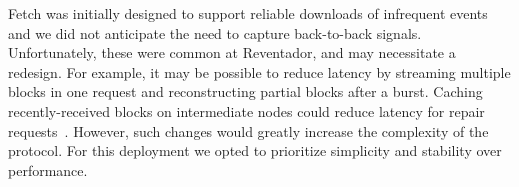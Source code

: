 
Fetch was initially designed to support reliable downloads of infrequent
events and we did not anticipate the need to capture back-to-back signals.
Unfortunately, these were common at Reventador, and may necessitate a
redesign. For example, it may be possible to reduce latency by streaming
multiple blocks in one request and reconstructing partial blocks after a
burst. Caching recently-received blocks on intermediate nodes could reduce
latency for repair requests~\cite{netshm-emnets05}.  However, such changes
would greatly increase the complexity of the protocol. For this deployment we
opted to prioritize simplicity and stability over performance.



